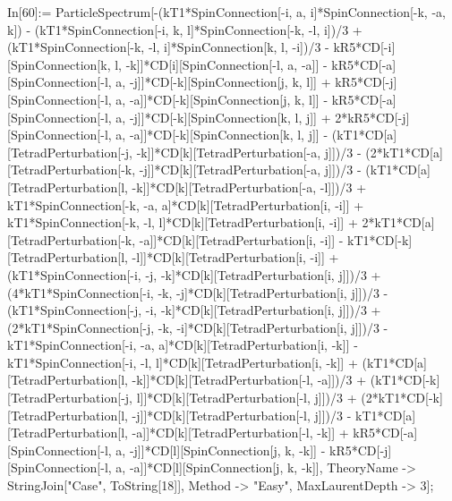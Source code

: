 In[60]:= ParticleSpectrum[-(kT1*SpinConnection[-i, a, i]*SpinConnection[-k, -a, k]) - (kT1*SpinConnection[-i, k, l]*SpinConnection[-k, -l, i])/3 + (kT1*SpinConnection[-k, -l, i]*SpinConnection[k, l, -i])/3 - kR5*CD[-i][SpinConnection[k, l, -k]]*CD[i][SpinConnection[-l, a, -a]] - kR5*CD[-a][SpinConnection[-l, a, -j]]*CD[-k][SpinConnection[j, k, l]] + kR5*CD[-j][SpinConnection[-l, a, -a]]*CD[-k][SpinConnection[j, k, l]] - kR5*CD[-a][SpinConnection[-l, a, -j]]*CD[-k][SpinConnection[k, l, j]] + 2*kR5*CD[-j][SpinConnection[-l, a, -a]]*CD[-k][SpinConnection[k, l, j]] - (kT1*CD[a][TetradPerturbation[-j, -k]]*CD[k][TetradPerturbation[-a, j]])/3 - (2*kT1*CD[a][TetradPerturbation[-k, -j]]*CD[k][TetradPerturbation[-a, j]])/3 - (kT1*CD[a][TetradPerturbation[l, -k]]*CD[k][TetradPerturbation[-a, -l]])/3 + kT1*SpinConnection[-k, -a, a]*CD[k][TetradPerturbation[i, -i]] + kT1*SpinConnection[-k, -l, l]*CD[k][TetradPerturbation[i, -i]] + 2*kT1*CD[a][TetradPerturbation[-k, -a]]*CD[k][TetradPerturbation[i, -i]] - kT1*CD[-k][TetradPerturbation[l, -l]]*CD[k][TetradPerturbation[i, -i]] + (kT1*SpinConnection[-i, -j, -k]*CD[k][TetradPerturbation[i, j]])/3 + (4*kT1*SpinConnection[-i, -k, -j]*CD[k][TetradPerturbation[i, j]])/3 - (kT1*SpinConnection[-j, -i, -k]*CD[k][TetradPerturbation[i, j]])/3 + (2*kT1*SpinConnection[-j, -k, -i]*CD[k][TetradPerturbation[i, j]])/3 - kT1*SpinConnection[-i, -a, a]*CD[k][TetradPerturbation[i, -k]] - kT1*SpinConnection[-i, -l, l]*CD[k][TetradPerturbation[i, -k]] + (kT1*CD[a][TetradPerturbation[l, -k]]*CD[k][TetradPerturbation[-l, -a]])/3 + (kT1*CD[-k][TetradPerturbation[-j, l]]*CD[k][TetradPerturbation[-l, j]])/3 + (2*kT1*CD[-k][TetradPerturbation[l, -j]]*CD[k][TetradPerturbation[-l, j]])/3 - kT1*CD[a][TetradPerturbation[l, -a]]*CD[k][TetradPerturbation[-l, -k]] + kR5*CD[-a][SpinConnection[-l, a, -j]]*CD[l][SpinConnection[j, k, -k]] - kR5*CD[-j][SpinConnection[-l, a, -a]]*CD[l][SpinConnection[j, k, -k]], TheoryName -> StringJoin["Case", ToString[18]], Method -> "Easy", MaxLaurentDepth -> 3]; 
